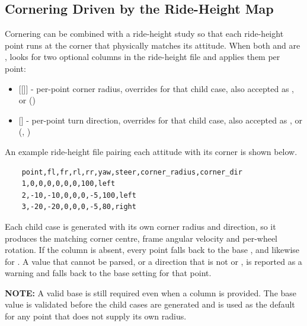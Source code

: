 \subsection{Cornering Driven by the Ride-Height Map}
Cornering can be combined with a ride-height study so that each ride-height point runs at the corner that physically matches its attitude. When both  and  are ,  looks for two optional columns in the ride-height file and applies them per point:
\begin{itemize}
    \item {} [[]] - per-point corner radius, overrides  for that child case, also accepted as ,  or  ()

    \item {} [] - per-point turn direction, overrides  for that child case, also accepted as ,  or  (, )
\end{itemize}
An example ride-height file pairing each attitude with its corner is shown below.
\begin{lstlisting}
    point,fl,fr,rl,rr,yaw,steer,corner_radius,corner_dir
    1,0,0,0,0,0,0,100,left
    2,-10,-10,0,0,0,-5,100,left
    3,-20,-20,0,0,0,-5,80,right
\end{lstlisting}
Each child case is generated with its own corner radius and direction, so it produces the matching corner centre, frame angular velocity and per-wheel rotation. If the  column is absent, every point falls back to the base , and likewise for . A value that cannot be parsed, or a direction that is not  or , is reported as a warning and falls back to the base setting for that point.

\textbf{NOTE:} A valid base  is still required even when a  column is provided. The base value is validated before the child cases are generated and is used as the default for any point that does not supply its own radius.

